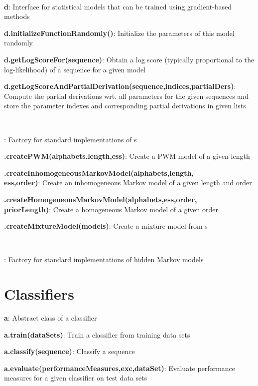 \documentclass[10pt]{scrartcl}
\newcommand{\entry}[3]{{\bfseries #1#2}: #3}
\begin{document}
\begin{flushleft}
~

\entry{\DiffSM}{ d}{Interface for statistical models that can be trained using gradient-based methods}

\entry{d}{.initializeFunctionRandomly()}{Initialize the parameters of this model randomly}

\entry{d}{.getLogScoreFor(sequence)}{Obtain a log score (typically proportional to the log-likelihood) of a sequence for a given model}

\entry{d}{.getLogScoreAndPartialDerivation(sequence,indices,partialDers)}{Compute the partial derivations wrt. all parameters for the given sequences and store the parameter indexes and corresponding partial derivations in given lists}

~

%
\entry{\DiffSMFactory}{}{Factory for standard implementations of \DiffSM s}

\entry{\DiffSMFactory}{.createPWM(alphabets,length,ess)}{Create a PWM model of a given length}

\entry{\DiffSMFactory}{.createInhomogeneousMarkovModel(alphabets,length,\\ess,order)}{Create an inhomogeneous Markov model of a given length and order}

\entry{\DiffSMFactory}{.createHomogeneousMarkovModel(alphabets,ess,order,\\priorLength)}{Create a homogeneous Markov model of a given order}

\entry{\DiffSMFactory}{.createMixtureModel(models)}{Create a mixture model from \DiffSM s}

~

\entry{\HMMFactory}{}{Factory for standard implementations of hidden Markov models}

\section{Classifiers}

\entry{\AbstractClassifier}{ a}{Abstract class of a classifier}

\entry{a}{.train(dataSets)}{Train a classifier from training data sets}

\entry{a}{.classify(sequence)}{Classify a sequence}

\entry{a}{.evaluate(performanceMeasures,exc,dataSet)}{Evaluate performance measures for a given classifier on test data sets}


\end{flushleft}
\end{document}

